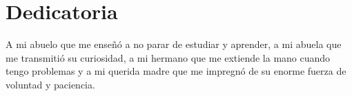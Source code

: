 \chapter*{Dedicatoria}

A mi abuelo que me enseñó a no parar de
estudiar y aprender, a mi abuela que me
transmitió su curiosidad, a mi hermano que
me extiende la mano cuando tengo problemas y a 
mi querida madre que me impregnó de su enorme
fuerza de voluntad y paciencia.